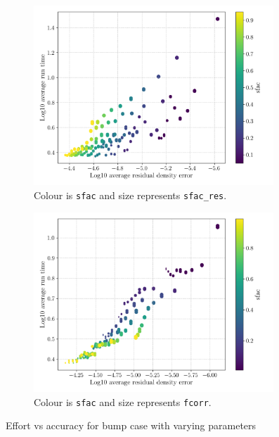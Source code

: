 \documentclass{article}
\begin{document}
\begin{figure}[H]
    \begin{subfigure}{0.49\textwidth}
        \centering
        \includegraphics[width=0.99\textwidth]{figures/effort_vs_accuracy_sfac_res.png}
        \caption{Colour is \texttt{sfac} and size represents \texttt{sfac\_res}.}
        \label{fig:effort_vs_accuracy_sfac_res}
    \end{subfigure}
    \begin{subfigure}{0.49\textwidth}
        \centering
        \includegraphics[width=0.99\textwidth]{figures/effort_vs_accuracy_fcorr.png}
        \caption{Colour is \texttt{sfac} and size represents \texttt{fcorr}.}
        \label{fig:effort_vs_accuracy_fcorr}
    \end{subfigure}
    \caption{Effort vs accuracy for bump case with varying parameters}
\end{figure}
\end{document}
